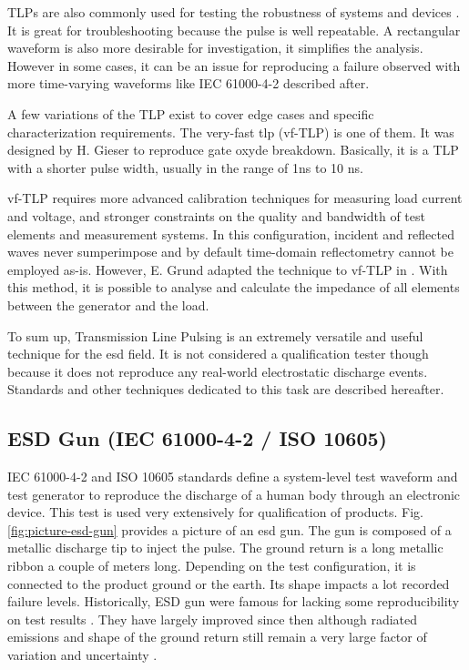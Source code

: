 TLPs are also commonly used for testing the robustness of systems and devices \cite{TLPthroubleshooting, LacrampeTransientImmunity}.
It is great for troubleshooting because the pulse is well repeatable.
A rectangular waveform is also more desirable for investigation, it simplifies the analysis.
However in some cases, it can be an issue for reproducing a failure observed with more time-varying waveforms like IEC 61000-4-2 \cite{iec61000-4-2} described after.

A few variations of the TLP exist to cover edge cases and specific characterization requirements.
The very-fast \gls{tlp} (vf-TLP) is one of them.
It was designed by H. Gieser \cite{vf-tlp} to reproduce gate oxyde breakdown.
Basically, it is a TLP with a shorter pulse width, usually in the range of 1ns to 10 ns.

vf-TLP requires more advanced calibration techniques for measuring load current and voltage, and stronger constraints on the quality and bandwidth of test elements and measurement systems.
In this configuration, incident and reflected waves never sumperimpose and by default time-domain reflectometry cannot be employed as-is.
However, E. Grund adapted the technique to vf-TLP in \cite{vf-tlp-tdr}.
With this method, it is possible to analyse and calculate the impedance of all elements between the generator and the load.

To sum up, Transmission Line Pulsing is an extremely versatile and useful technique for the \gls{esd} field.
It is not considered a qualification tester though because it does not reproduce any real-world electrostatic discharge events.
Standards and other techniques dedicated to this task are described hereafter.

\subsection{ESD Gun (IEC 61000-4-2 / ISO 10605)}

IEC 61000-4-2 \cite{iec61000-4-2} and ISO 10605 \cite{iso10605} standards define a system-level test waveform and test generator to reproduce the discharge of a human body through an electronic device.
This test is used very extensively for qualification of products.
Fig. \ref{fig:picture-esd-gun} provides a picture of an \gls{esd} gun.
The gun is composed of a metallic discharge tip to inject the pulse.
The ground return is a long metallic ribbon a couple of meters long.
Depending on the test configuration, it is connected to the product ground or the earth.
Its shape impacts a lot recorded failure levels.
Historically, ESD gun were famous for lacking some reproducibility on test results \cite{hmm-uncertainty}.
They have largely improved since then although radiated emissions and shape of the ground return still remain a very large factor of variation and uncertainty \cite{gun-rf-uncertainty}.

